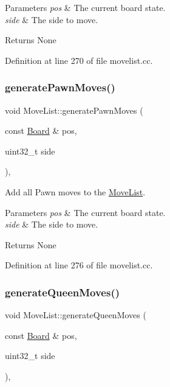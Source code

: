\begin{DoxyParams}{Parameters}
{\em pos} & The current board state. \\
\hline
{\em side} & The side to move. \\
\hline
\end{DoxyParams}
\begin{DoxyReturn}{Returns}
None 
\end{DoxyReturn}


Definition at line 270 of file movelist.\+cc.

\mbox{\label{classMoveList_a309f4e2408ad522162cda7e2e778d66f}} 
\subsubsection{\texorpdfstring{generate\+Pawn\+Moves()}{generatePawnMoves()}}
{\footnotesize\ttfamily void Move\+List\+::generate\+Pawn\+Moves (\begin{DoxyParamCaption}\item[{const \mbox{\hyperlink{classBoard}{Board}} \&}]{pos,  }\item[{uint32\+\_\+t}]{side }\end{DoxyParamCaption})\hspace{0.3cm}{\ttfamily [private]}, {\ttfamily [noexcept]}}



Add all Pawn moves to the \mbox{\hyperlink{classMoveList}{Move\+List}}. 


\begin{DoxyParams}{Parameters}
{\em pos} & The current board state. \\
\hline
{\em side} & The side to move. \\
\hline
\end{DoxyParams}
\begin{DoxyReturn}{Returns}
None 
\end{DoxyReturn}


Definition at line 276 of file movelist.\+cc.

\mbox{\label{classMoveList_a8f0dedc3c310ad2ce503e9327c089997}} 
\subsubsection{\texorpdfstring{generate\+Queen\+Moves()}{generateQueenMoves()}}
{\footnotesize\ttfamily void Move\+List\+::generate\+Queen\+Moves (\begin{DoxyParamCaption}\item[{const \mbox{\hyperlink{classBoard}{Board}} \&}]{pos,  }\item[{uint32\+\_\+t}]{side }\end{DoxyParamCaption})\hspace{0.3cm}{\ttfamily [private]}, {\ttfamily [noexcept]}}



